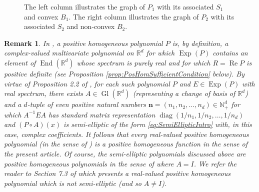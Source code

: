 \documentclass[11pt, letter]{book}
\newtheorem{remark}{Remark}
\newenvironment{example}
  {\pushQED{\qed}\renewcommand{\qedsymbol}{$\triangle$}\examplex}
  {\popQED\endexamplex}
\renewcommand\Re{\operatorname{Re}}%
\newcommand\End{\operatorname{End}} %
\newcommand\Gl{\operatorname{Gl}} %
\newcommand\Exp{\operatorname{Exp}}
\newcommand\diag{\operatorname{diag}}
\begin{document}
\begin{example}
\begin{figure}[!htb]
\begin{subfigure}{0.5\textwidth}
    \end{subfigure}
    \caption{The left column illustrates the graph of $P_1$ with its associated $S_1$ and convex $B_1$. The right column illustrates the graph of $P_2$ with its associated $S_2$ and non-convex $B_2$.}
    \label{fig:PoneAndtwo}
\end{figure}
\begin{remark}\label{rmk:PositiveHomogeneousPolynomialsVSFunctions}
In \cite{randles_convolution_2017}, a positive homogeneous polynomial $P$ is, by definition, a complex-valued multivariate polynomial on $\mathbb{R}^d$ for which $\Exp(P)$ contains an element of $\End(\mathbb{R}^d)$ whose spectrum is purely real and for which $R=\Re P$ is positive definite (see Proposition \ref{prop:PosHomSufficientCondition} below). By virtue of Proposition 2.2 of \cite{randles_convolution_2017}, for each such polynomial $P$ and $E\in\Exp(P)$ with real spectrum, there exists $A\in\Gl(\mathbb{R}^d)$ (representing a change of basis of $\mathbb{R}^d$) and a $d$-tuple of even positive natural numbers $\mathbf{n}=(n_1,n_2,\dots,n_d)\in\mathbb{N}_+^d$ for which $A^{-1}EA$ has standard matrix representation $\diag(1/n_1,1/n_2,\dots,1/n_d)$ and $(P\circ A)(x)$ is semi-elliptic of the form \eqref{eq:SemiEllipticIntro} with, in this case, complex coefficients. It follows that every real-valued positive homogeneous polynomial (in the sense of \cite{randles_convolution_2017}) is a positive homogeneous function in the sense of the present article. Of course, the semi-elliptic polynomials discussed above are positive homogeneous polynomials in the sense of \cite{randles_convolution_2017} where $A=I$. We refer the reader to Section 7.3 of \cite{randles_convolution_2017} which presents a real-valued positive homogeneous polynomial which is not semi-elliptic (and so $A\neq I$).
\end{remark}
\end{example}
\end{document}
